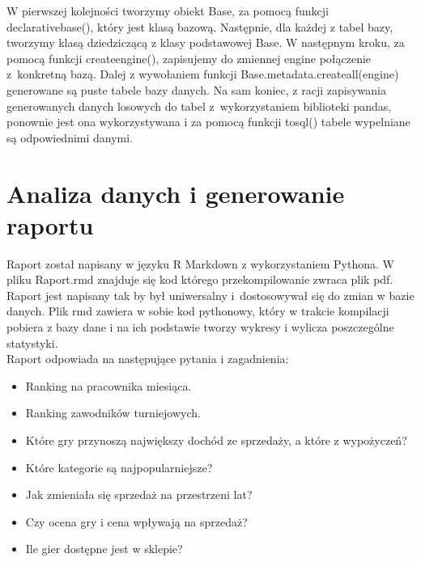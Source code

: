 \documentclass{article}
\begin{document}
	
	\noindent W pierwszej kolejności tworzymy obiekt Base, za pomocą funkcji declarative\textunderscore base(), który jest klasą bazową. Następnie, dla każdej z tabel bazy, tworzymy klasą dziedziczącą z klasy podstawowej Base. W następnym kroku, za pomocą funkcji create\textunderscore engine(), zapisujemy do zmiennej engine połączenie z~konkretną bazą. Dalej z wywołaniem funkcji Base.metadata.create\textunderscore all(engine) generowane są puste tabele bazy danych. Na sam koniec, z racji zapisywania generowanych danych losowych do tabel z~wykorzystaniem biblioteki pandas, ponownie jest ona wykorzystywana i za pomocą funkcji to\textunderscore sql() tabele wypelniane są odpowiednimi danymi.
	
	
	
	\section{Analiza danych i generowanie raportu}
	
	Raport został napisany w języku R Markdown z wykorzystaniem Pythona. W pliku Raport.rmd znajduje się kod którego przekompilowanie zwraca plik pdf. Raport jest napisany tak by był uniwersalny i~dostosowywał się do zmian w bazie danych. Plik rmd zawiera w sobie kod pythonowy, który w trakcie kompilacji pobiera z bazy dane i na ich podstawie tworzy wykresy i wylicza poszczególne statystyki.\\

	\noindent Raport odpowiada na następujące pytania i zagadnienia:
	\begin{itemize}
		\item Ranking na pracownika miesiąca.
		\item Ranking zawodników turniejowych.
		\item Które gry przynoszą największy dochód ze sprzedaży, a które z wypożyczeń?
		\item Które kategorie są najpopularniejsze?
		\item Jak zmieniała się sprzedaż na przestrzeni lat?
		\item Czy ocena gry i cena wpływają na sprzedaż?
		\item Ile gier dostępne jest w sklepie?
	\end{itemize}



	
\end{document}
